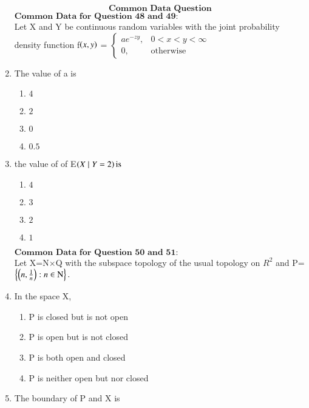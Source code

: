 \documentclass[journal]{IEEEtran}
\begin{document}
\begin{enumerate}[start=40]
\bigskip
$$\textbf{Common Data Question}$$
$\textbf{Common Data for  Question 48 and 49:}$\\
Let X and Y be continuous random variables with the joint probability density  function
f$\left(x, y\right)$ = 
$\begin{cases} 
    ae^{-zy}, & 0 < x < y < \infty \\ 
    0, & \text{otherwise} 
\end{cases}$
\item The value of a is 
\begin{multicols}{4}
    \begin{enumerate}
        \item $4$
        \item $2$
        \item $0$
        \item $0.5$
    \end{enumerate}
\end{multicols}
\bigskip
\item the value of of E$\left(X\mid Y=2\right)\text{is} $
\begin{multicols}{4}
    \begin{enumerate}
        \item $4$
        \item $3$
        \item $2$
        \item $1$
    \end{enumerate}
\end{multicols}
\bigskip
$\textbf{Common Data for  Question 50 and 51:}$\\
Let X=N$\times$Q with the subspace topology of the usual topology on $R^{2}$ and P=$\left\{\left(n,\frac{1}{n}\right):n\in \text{N}\right\}.$
\bigskip
\item In the space X, 
\begin{multicols}{2}
    \begin{enumerate}
        \item P is closed but is not open 
        \item P is open but is not closed 
        \item P is both  open and  closed 
        \item P is neither open but nor closed 
    \end{enumerate}
\end{multicols}
\bigskip
\item The boundary of P and X is 
\begin{multicols}{4}
    \begin{enumerate}

\end{enumerate}
\end{multicols}
\end{enumerate}
\end{document}
